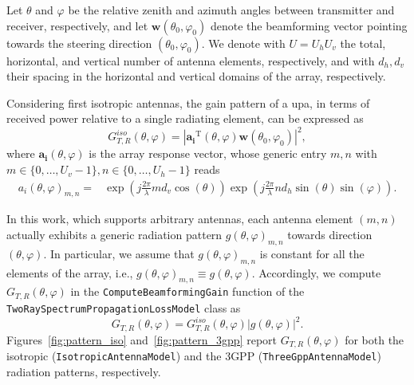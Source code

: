 Let $\theta$ and $\varphi$ be the relative zenith and azimuth angles between transmitter and receiver, respectively, and let $\bm{w}\left(\theta_0, \varphi_0\right)$ denote the beamforming vector pointing towards the steering direction $\left(\theta_0, \varphi_0\right)$. We denote with $U = U_h U_v $ the total, horizontal, and vertical number of antenna elements, respectively, and with $ d_h, d_v $ their spacing in the horizontal and vertical domains of the array, respectively. %

Considering first isotropic antennas, the gain pattern of a \gls{upa}, in terms of received power relative to a single radiating element, can be expressed as~\cite{ASPLUND202089}
\begin{equation}
  G_{T, R}^{iso}(\theta, \varphi) = \left| \bm{a_i}^{\mathrm{T}}(\theta, \varphi)  \bm{w}\left(\theta_0, \varphi_0\right) \right|^2,
\end{equation}
where $\bm{a_i}(\theta, \varphi)$ is the array response vector, whose generic entry $m,n$ with $m \in \{0, \ldots, U_v - 1 \}, n \in \{0, \ldots, U_h - 1 \}$ reads
\begin{align}
  a_i (\theta, \varphi)_{m, n} = & \exp \left( j\frac{2\pi}{\lambda}m d_v \cos(\theta) \right) \exp\left( j \frac{2\pi}{\lambda} n d_h \sin(\theta)\sin(\varphi) \right). \nonumber
\end{align} 

In this work, which supports arbitrary antennas, each antenna element $(m, n)$ actually exhibits a generic radiation pattern $g(\theta, \varphi)_{m, n}$ towards direction $(\theta, \varphi)$. In particular, we assume that $g(\theta, \varphi)_{m, n}$ is constant for all the elements of the array, i.e., $g(\theta, \varphi)_{m, n} \equiv g(\theta, \varphi)$. 
Accordingly, we compute $G_{T, R}(\theta, \varphi)$ in the \texttt{Compute\-Beamforming\-Gain} function of the \texttt{Two\-Ray\-Spectrum\-Propagation\-Loss\-Model} class as
\begin{equation}
  G_{T, R}(\theta, \varphi) =  G_{T, R}^{iso}(\theta, \varphi) \left| g(\theta, \varphi) \right|^2.
\end{equation}
%
Figures~\ref{fig:pattern_iso} and~\ref{fig:pattern_3gpp} report $G_{T, R} (\theta, \varphi)$ for both the isotropic (\texttt{Isotropic\-Antenna\-Model}) and the 3GPP (\texttt{ThreeGpp\-Antenna\-Model}) radiation patterns, respectively. 

